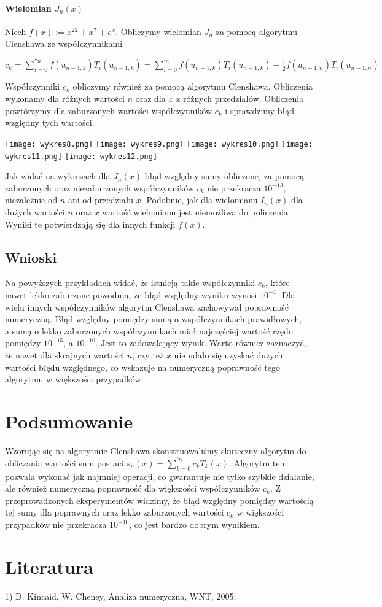 \documentclass[10pt]{article}
\begin{document}
\paragraph{Wielomian $J_{n}(x)$}
Niech $f(x) := x^{22} + x^{7} + e^{x}$. Obliczymy wielomian $J_{n}$ za pomocą algorytmu Clenshawa ze współczynnikami 
\begin{center}
$c_{k} = \sum_{i=0}^{''n} f(u_{n-1,k}) T_{i}(u_{n-1,k}) = \sum_{i=0}^{'n} f(u_{n-1,k}) T_{i}(u_{n-1,k}) - \frac{1}{2} f(u_{n-1,n}) T_{i}(u_{n-1,n})$
\end{center}
Współczynniki $c_{k}$ obliczymy również za pomocą algorytmu Clenshawa.
Obliczenia wykonamy dla różnych wartości $n$ oraz dla $x$ z różnych przedziałów. Obliczenia powtórzymy dla zaburzonych wartości współczynników $c_{k}$ i sprawdzimy błąd względny tych wartości.
\begin{center}
\texttt{[image: wykres8.png]}
\texttt{[image: wykres9.png]}
\texttt{[image: wykres10.png]}
\texttt{[image: wykres11.png]}
\texttt{[image: wykres12.png]}
\end{center}
Jak widać na wykresach dla $J_{n}(x)$ błąd względny sumy obliczonej za pomocą zaburzonych oraz niezaburzonych współczynników $c_{k}$ nie przekracza $10^{-13}$, niezależnie od $n$ ani od przedziału $x$. Podobnie, jak dla wielomianu $I_{n}(x)$ dla dużych wartości $n$ oraz $x$ wartość wielomianu jest niemożliwa do policzenia. Wyniki te potwierdzają się dla innych funkcji $f(x)$.

\subsection{Wnioski}
Na powyższych przykładach widać, że istnieją takie współczynniki $c_{k}$, które nawet lekko zaburzone powodują, że błąd względny wyniku wynosi $10^{-1}$. Dla wielu innych współczynników algorytm Clenshawa zachowywał poprawność numeryczną. Błąd względny pomiędzy sumą o współczynnikach prawidłowych,\\ a sumą o lekko zaburzonych współczynnikach miał najczęściej wartość rzędu pomiędzy $10^{-15}$, a $10^{-10}$. Jest to zadowalający wynik. Warto również zaznaczyć, że nawet dla skrajnych wartości $n$, czy też $x$ nie udało się uzyskać dużych wartości błędu względnego, co wskazuje na numeryczną poprawność tego algorytmu w większości przypadków.

\section{Podsumowanie}
Wzorując się na algorytmie Clenshawa skonstruowaliśmy skuteczny algorytm do obliczania wartości sum postaci $s_{n}(x) = \sum_{k=0}^{'n} c_{k} T_{k}(x)$. Algorytm ten pozwala wykonać jak najmniej operacji, co gwarantuje nie tylko szybkie działanie, ale również numeryczną poprawność dla większości współczynników $c_{k}$. Z przeprowadzonych eksperymentów widzimy, że błąd względny pomiędzy wartością tej sumy dla poprawnych oraz lekko zaburzonych wartości $c_{k}$ w większości przypadków nie przekracza $10^{-10}$, co jest bardzo dobrym wynikiem.
\section{Literatura}

1) D. Kincaid, W. Cheney, Analiza numeryczna, WNT, 2005.\\
\end{document}
